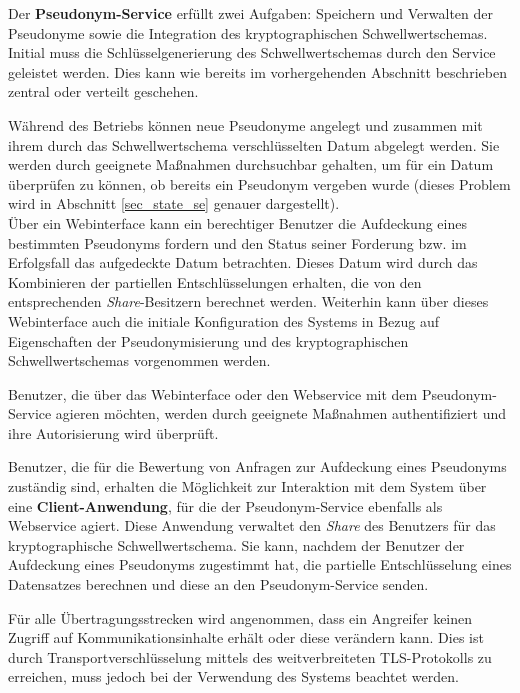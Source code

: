 Der \textbf{Pseudonym-Service} erfüllt zwei Aufgaben: Speichern und Verwalten der Pseudonyme sowie die Integration des kryptographischen Schwellwertschemas. Initial muss die Schlüsselgenerierung des Schwellwertschemas durch den Service geleistet werden. Dies kann wie bereits im vorhergehenden Abschnitt beschrieben zentral oder verteilt geschehen.

Während des Betriebs können  neue Pseudonyme angelegt und zusammen mit ihrem durch das Schwellwertschema verschlüsselten Datum abgelegt werden. Sie werden durch geeignete Maßnahmen durchsuchbar gehalten, um für ein Datum überprüfen zu können, ob bereits ein Pseudonym vergeben wurde (dieses Problem wird in Abschnitt \ref{sec_state_se} genauer dargestellt).\\
Über ein Webinterface kann ein berechtiger Benutzer die Aufdeckung eines bestimmten Pseudonyms fordern und den Status seiner Forderung bzw. im Erfolgsfall das aufgedeckte Datum betrachten. Dieses Datum wird durch das Kombinieren der partiellen Entschlüsselungen erhalten, die von den entsprechenden \textit{Share}-Besitzern berechnet werden. Weiterhin kann über dieses Webinterface auch die initiale Konfiguration des Systems in Bezug auf Eigenschaften der Pseudonymisierung und des kryptographischen Schwellwertschemas vorgenommen werden.

Benutzer, die über das Webinterface oder den Webservice mit dem Pseudonym-Service agieren möchten, werden durch geeignete Maßnahmen authentifiziert und ihre Autorisierung wird überprüft.

Benutzer, die für die Bewertung von Anfragen zur Aufdeckung eines Pseudonyms zuständig sind, erhalten die Möglichkeit zur Interaktion mit dem System über eine \textbf{Client-Anwendung}, für die der Pseudonym-Service ebenfalls als Webservice agiert. Diese Anwendung verwaltet den \textit{Share} des Benutzers für das kryptographische Schwellwertschema. Sie kann, nachdem der Benutzer der Aufdeckung eines Pseudonyms zugestimmt hat, die partielle Entschlüsselung eines Datensatzes berechnen und diese an den Pseudonym-Service senden.

Für alle Übertragungsstrecken wird angenommen, dass ein Angreifer keinen Zugriff auf Kommunikationsinhalte erhält oder diese verändern kann. Dies ist durch Transportverschlüsselung mittels des weitverbreiteten TLS-Protokolls zu erreichen, muss jedoch bei der Verwendung des Systems beachtet werden. 